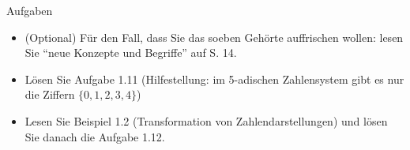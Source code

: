 \begin{frame}{Aufgaben}
\begin{itemize}
    \item (Optional) Für den Fall, dass Sie das soeben Gehörte auffrischen wollen: lesen Sie ``neue Konzepte und Begriffe'' auf S. 14.
    \item Lösen Sie Aufgabe 1.11 (Hilfestellung: im 5-adischen Zahlensystem gibt es nur die Ziffern $\{0,1,2,3,4\}$)
    \item Lesen Sie Beispiel 1.2 (Transformation von Zahlendarstellungen) und lösen Sie danach die Aufgabe 1.12.
\end{itemize}
\end{frame}